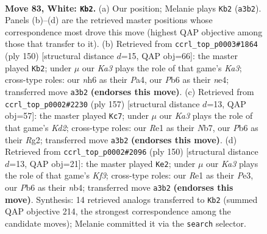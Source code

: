 \documentclass[11pt]{article}
\begin{document}
\clearpage

\begin{figure}[p]\centering
\begin{subfigure}{0.46\textwidth}\centering
\resizebox{\linewidth}{!}{%
\newchessgame
\chessboard[
  setfen={6k1/P7/1P5n/8/8/K6r/8/4R3 w - - 1 83},
  showmover=false,
  pgfstyle=straightmove, color=movearrow, markmove={a3-b2}
]}
\caption{}
\end{subfigure}\hfill
\begin{subfigure}{0.46\textwidth}\centering
\resizebox{\linewidth}{!}{%
\newchessgame
\chessboard[
  setfen={6R1/8/8/8/P1k1n3/K6r/8/8 w - - 4 76},
  showmover=false,
  pgfstyle=straightmove, color=movearrow, markmove={a3-b2}
]}
\caption{}
\end{subfigure}
\\[4pt]
\begin{subfigure}{0.46\textwidth}\centering
\resizebox{\linewidth}{!}{%
\newchessgame
\chessboard[
  setfen={8/1n1k4/8/8/1K6/8/6r1/1N1R4 b - - 12 79},
  showmover=false,
  pgfstyle=straightmove, color=movearrow, markmove={d7-c7}
]}
\caption{}
\end{subfigure}\hfill
\begin{subfigure}{0.46\textwidth}\centering
\resizebox{\linewidth}{!}{%
\newchessgame
\chessboard[
  setfen={8/8/8/1k3r2/1n5R/4PK2/8/8 w - - 6 76},
  showmover=false,
  pgfstyle=straightmove, color=movearrow, markmove={f3-e2}
]}
\caption{}
\end{subfigure}
\caption{\textbf{Move 83, White: \texttt{Kb2}.} (a) Our position; Melanie plays \texttt{Kb2} (\texttt{a3b2}). Panels (b)--(d) are the retrieved master positions whose correspondence most drove this move (highest QAP objective among those that transfer to it). (b) Retrieved from \texttt{ccrl\_top\_p0003\#1864} (ply 150) [structural distance $d$=15, QAP obj=66]: the master played \texttt{Kb2}; under $\mu$ our \emph{Ka3} plays the role of that game's \emph{Ka3}; cross-type roles: our \emph{n}h6 as their \emph{P}a4, our \emph{P}b6 as their \emph{n}e4; transferred move \texttt{a3b2} \textbf{(endorses this move)}. (c) Retrieved from \texttt{ccrl\_top\_p0002\#2230} (ply 157) [structural distance $d$=13, QAP obj=57]: the master played \texttt{Kc7}; under $\mu$ our \emph{Ka3} plays the role of that game's \emph{Kd2}; cross-type roles: our \emph{R}e1 as their \emph{N}b7, our \emph{P}b6 as their \emph{R}g2; transferred move \texttt{a3b2} \textbf{(endorses this move)}. (d) Retrieved from \texttt{ccrl\_top\_p0002\#2096} (ply 150) [structural distance $d$=13, QAP obj=21]: the master played \texttt{Ke2}; under $\mu$ our \emph{Ka3} plays the role of that game's \emph{Kf3}; cross-type roles: our \emph{R}e1 as their \emph{P}e3, our \emph{P}b6 as their \emph{n}b4; transferred move \texttt{a3b2} \textbf{(endorses this move)}. Synthesis: 14 retrieved analogs transferred to \texttt{Kb2} (summed QAP objective 214, the strongest correspondence among the candidate moves); Melanie committed it via the \texttt{search} selector.}
\label{fig:thought-m164}
\end{figure}
\end{document}
